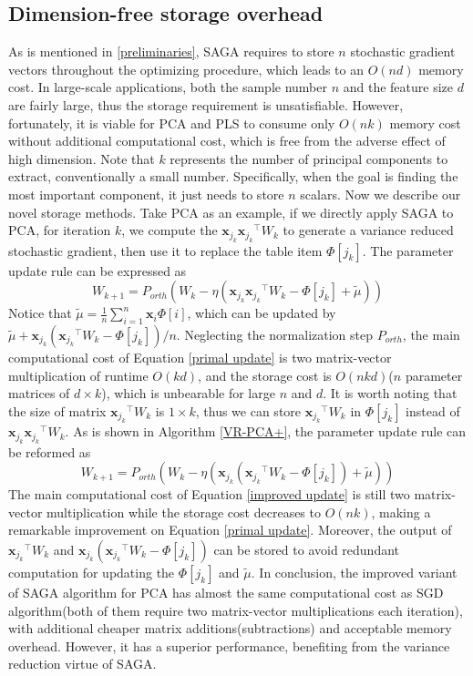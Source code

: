 \documentclass[conference]{IEEEtran}
\begin{document}
 \subsection{Dimension-free storage overhead}
 As is mentioned in \ref{preliminaries}, SAGA requires to store $n$ stochastic gradient vectors throughout the optimizing procedure, which leads to an $O(nd)$ memory cost. In large-scale applications, both the  sample number $n$ and the feature size $d$ are fairly large, thus the storage requirement is unsatisfiable. However, fortunately, it is viable for PCA and PLS to consume only $O(nk)$ memory cost without additional computational cost, which is free from the adverse effect of high dimension. Note that $k$ represents the number of principal components to extract, conventionally a small number. Specifically, when the goal is finding the most important component, it just needs to store $n$ scalars.
 Now we describe our novel storage methods. 
 Take PCA as an example, if we directly apply SAGA to PCA, for iteration $k$, we compute the $\mathbf{x}_{j_k}{\mathbf{x}_{j_k}}^{\top}W_k$ to generate a variance reduced stochastic gradient, then use it to replace the table item $\Phi[{j_k}]$. The parameter update rule can be expressed as
 \begin{equation}
 \label{primal update}
 W_{k+1} = P_{orth}(W_k - \eta(\mathbf{x}_{j_k}{\mathbf{x}_{j_k}}^{\top}W_k - \Phi[{j_k}] + \tilde{\mu}))
 \end{equation}
 Notice that $\tilde{\mu} = \frac{1}{n}\sum\limits_{i=1}^{n}\mathbf{x}_i\Phi[i]$, which can be updated by $ \tilde{\mu} + \mathbf{x}_{j_k}({\mathbf{x}_{j_k}}^{\top}W_k - \Phi[{j_k}])/n$. Neglecting the normalization step $P_{orth}$, the main computational cost of Equation \ref{primal update} is two matrix-vector multiplication of runtime $O(kd)$, and the storage cost is $O(nkd)$($n$ parameter matrices of $d \times k$), which is unbearable for large $n$ and $d$. 
It is worth noting that the size of matrix ${\mathbf{x}_{j_k}}^{\top}W_k$ is $1 \times k$, thus we can store ${\mathbf{x}_{j_k}}^{\top}W_k$ in $\Phi[{j_k}]$ instead of $\mathbf{x}_{j_k}{\mathbf{x}_{j_k}}^{\top}W_k$. As is shown in Algorithm \ref{VR-PCA+}, the parameter update rule can be reformed as 
 \begin{equation}
 \label{improved update}
 W_{k+1} = P_{orth}(W_k - \eta(\mathbf{x}_{j_k}({\mathbf{x}_{j_k}}^{\top}W_k - \Phi[j_k]) + \tilde{\mu}))
 \end{equation}
 The main computational cost of Equation \ref{improved update} is still two matrix-vector multiplication while the storage cost decreases to $O(nk)$, making a remarkable improvement on Equation \ref{primal update}. Moreover, the output of ${\mathbf{x}_{j_k}}^{\top}W_k$ and $\mathbf{x}_{j_k}({\mathbf{x}_{j_k}}^{\top}W_k - \Phi[j_k])$ can be stored to avoid redundant computation for updating the $\Phi[j_k]$ and $\tilde{\mu}$. In conclusion, the improved variant of SAGA algorithm for PCA has almost the same computational cost as SGD algorithm(both of them require two matrix-vector multiplications each iteration), with additional cheaper matrix additions(subtractions) and acceptable memory overhead. However, it has a superior performance, benefiting from the variance reduction virtue of SAGA.
\end{document}

